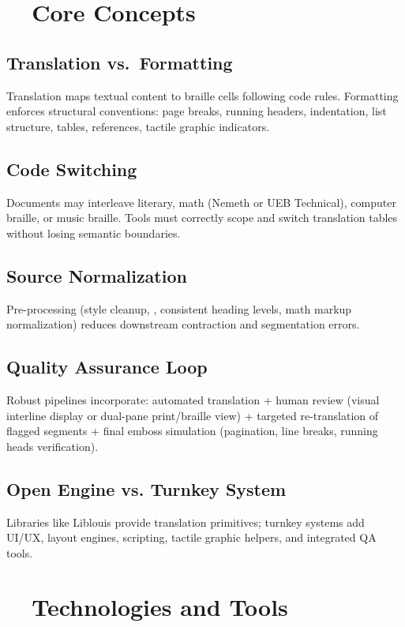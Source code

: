 \section{~~Core Concepts}
\label{sec:braille-core-concepts}
\subsection*{Translation vs.\ Formatting}
Translation maps textual content to braille cells following code rules. Formatting enforces structural conventions: page breaks, running headers, indentation, list structure, tables, references, tactile graphic indicators.

\subsection*{Code Switching}
Documents may interleave literary, math (Nemeth or UEB Technical), computer braille, or music braille. Tools must correctly scope and switch translation tables without losing semantic boundaries.

\subsection*{Source Normalization}
Pre-processing (style cleanup, , consistent heading levels, math markup normalization) reduces downstream contraction and segmentation errors.

\subsection*{Quality Assurance Loop}
Robust pipelines incorporate: automated translation + human review (visual interline display or dual-pane print/braille view) + targeted re-translation of flagged segments + final emboss simulation (pagination, line breaks, running heads verification).

\subsection*{Open Engine vs. Turnkey System}
Libraries like Liblouis provide translation primitives; turnkey systems add UI/UX, layout engines, scripting, tactile graphic helpers, and integrated QA tools.

\section{~~Technologies and Tools}
\label{sec:braille-tools}
